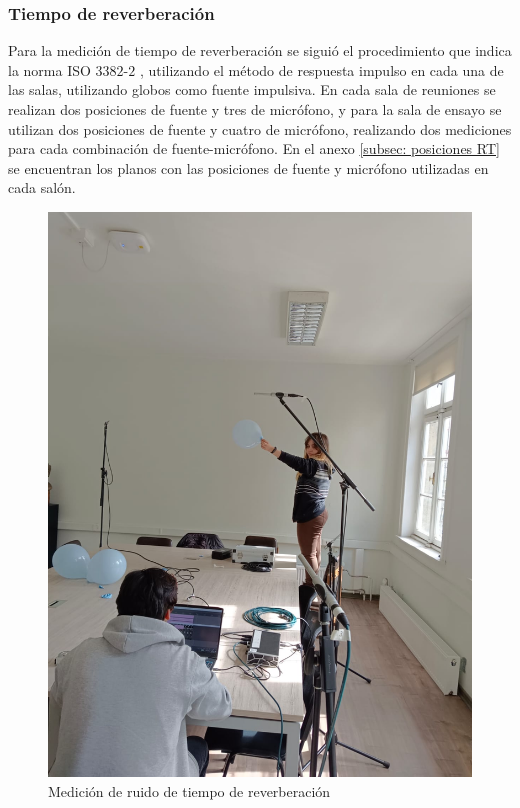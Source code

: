 \subsubsection{Tiempo de reverberación}
\noindent Para la medición de tiempo de reverberación se siguió el procedimiento que indica la norma ISO $3382$-$2$ \cite{ISO3382-2}, utilizando el método de respuesta impulso en cada una de las salas, utilizando globos como fuente impulsiva.
En cada sala de reuniones se realizan dos posiciones de fuente y tres de micrófono, y para la sala de ensayo se utilizan dos posiciones de fuente y cuatro de micrófono, realizando dos mediciones para cada combinación de fuente-micrófono. En el anexo \ref{subsec: posiciones RT} se encuentran los planos con las posiciones de fuente y micrófono utilizadas en cada salón.

\begin{figure}[H]
    \centering
    \includegraphics[scale=0.15]{Imagenes/mediciones/medicionRT.jpeg}
    \caption{Medición de ruido de tiempo de reverberación}
    \label{fig: medicionRT}
\end{figure}



